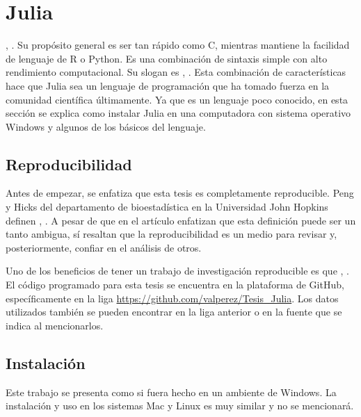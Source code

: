 \chapter{Julia}

, \cite{Hackers}.  Su propósito general es ser tan rápido como \textsf{C}, mientras mantiene la facilidad de lenguaje de \textsf{R} o \textsf{Python}. Es una combinación de sintaxis simple con alto rendimiento computacional. Su slogan es , \cite{Hackers}. 
Esta combinación de características hace que \textsf{Julia} sea un lenguaje de programación que ha tomado fuerza  en la comunidad científica últimamente. Ya que es un lenguaje poco conocido, en esta sección se explica como instalar \textsf{Julia} en una computadora con sistema operativo \textsf{Windows} y algunos de los básicos del lenguaje.

\section{Reproducibilidad}
Antes de empezar, se enfatiza que esta tesis es completamente reproducible. Peng y Hicks del departamento de bioestadística en la Universidad John Hopkins definen , \cite{peng2021reproducible}. A pesar de que en el artículo enfatizan que esta definición puede ser un tanto ambigua, sí resaltan que la reproducibilidad es un medio para revisar y, posteriormente, confiar en el análisis de otros. 

Uno de los beneficios de tener un trabajo de investigación reproducible es que , \cite{peng2021reproducible}. El código programado para esta tesis se encuentra en la plataforma de GitHub, específicamente en la liga \url{https://github.com/valperez/Tesis_Julia}. Los datos utilizados también se pueden encontrar en la liga anterior o en la fuente que se indica al mencionarlos. 

\section{Instalación}
Este trabajo se presenta como si fuera hecho en un ambiente de \textsf{Windows}. La instalación y uso en los sistemas \textsf{Mac} y \textsf{Linux} es muy similar y no se mencionará.  

